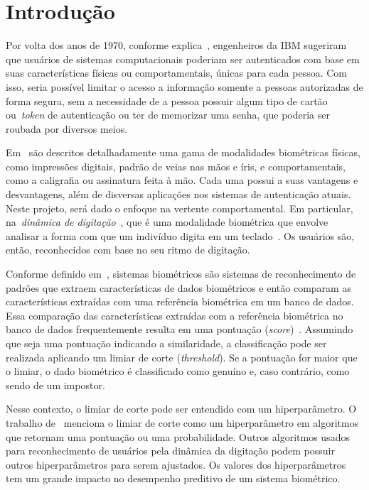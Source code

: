\section{Introdução}\label{sec:introduacao}

Por volta dos anos de 1970, conforme explica~, engenheiros da IBM sugeriram que usuários de sistemas computacionais poderiam ser autenticados com base em suas características físicas ou comportamentais, únicas para cada pessoa. Com isso, seria possível limitar o acesso a informação somente a pessoas autorizadas de forma segura, sem a necessidade de a pessoa possuir algum tipo de cartão ou~\textit{token} de autenticação ou ter de memorizar uma senha, que poderia ser roubada por diversos meios.

Em~\cite{handbook_of_biometrics} são descritos detalhadamente uma gama de modalidades biométricas físicas, como impressões digitais, padrão de veias nas mãos e íris, e comportamentais, como a caligrafia ou assinatura feita à mão. Cada uma possui a suas vantagens e desvantagens, além de disversas aplicações nos sistemas de autenticação atuais. Neste projeto, será dado o enfoque na vertente comportamental. Em particular, na~\textit{dinâmica de digitação}~\cite{Roy2022systematic}, que é uma modalidade biométrica que envolve analisar a forma com que um indivíduo digita em um teclado~\cite{monrose2000keystroke}. Os usuários são, então, reconhecidos com base no seu ritmo de digitação.

Conforme definido em~\cite{Jain2004_IntroToBiometrics}, sistemas biométricos são sistemas de reconhecimento de padrões que extraem características de dados biométricos e então comparam as características extraídas com uma referência biométrica em um banco de dados. Essa comparação das características extraídas com a referência biométrica no banco de dados frequentemente resulta em uma pontuação (\textit{score})~\cite{Jain2016_50Years}. Assumindo que seja uma pontuação indicando a similaridade, a classificação pode ser realizada aplicando um limiar de corte (\textit{threshold}). Se a pontuação for maior que o limiar, o dado biométrico é classificado como genuíno e, caso contrário, como sendo de um impostor.

Nesse contexto, o limiar de corte pode ser entendido com um hiperparâmetro. O trabalho de~ menciona o limiar de corte como um hiperparâmetro em algoritmos que retornam uma pontuação ou uma probabilidade. Outros algoritmos usados para reconhecimento de usuários pela dinâmica da digitação podem possuir outros hiperparâmetros para serem ajustados. Os valores dos hiperparâmetros tem um grande impacto no desempenho preditivo de um sistema biométrico.

